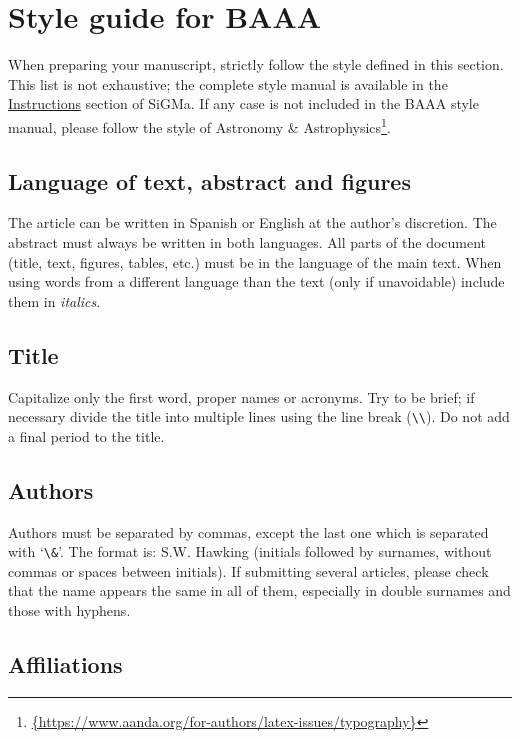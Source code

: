 \documentclass[baaa]{baaa}
\begin{document}
\section{Style guide for BAAA}\label{sec:guia}

When preparing your manuscript, strictly follow the style defined in this section. This list is not exhaustive; the complete style manual is available in the \href{http://sigma.fcaglp.unlp.edu.ar/docs/SGM_docs_v01/Surf/index.html}{Instructions} section of SiGMa. If any case is not included in the BAAA style manual, please follow the style of Astronomy \& Astrophysics\footnote{\url{{https://www.aanda.org/for-authors/latex-issues/typography}}}.

\subsection{Language of text, abstract and figures}

The article can be written in Spanish or English at the author's discretion. The abstract must always be written in both languages. All parts of the document (title, text, figures, tables, etc.) must be in the language of the main text. When using words from a different language than the text (only if unavoidable) include them in {\em italics}.

\subsection{Title}

Capitalize only the first word, proper names or acronyms. Try to be brief; if necessary divide the title into multiple lines using the line break (\verb|\\|). Do not add a final period to the title.

\subsection{Authors}

Authors must be separated by commas, except the last one which is separated with `\verb|\&|'. The format is: S.W. Hawking (initials followed by surnames, without commas or spaces between initials). If submitting several articles, please check that the name appears the same in all of them, especially in double surnames and those with hyphens.

\subsection{Affiliations}
\end{document}
